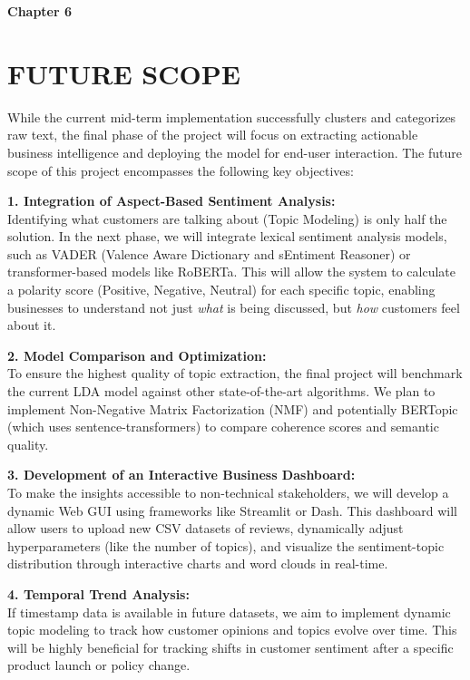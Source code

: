 \newpage
\clearpage
\textbf{\huge Chapter 6} 
\section{FUTURE SCOPE}
\begin{justify}
While the current mid-term implementation successfully clusters and categorizes raw text, the final phase of the project will focus on extracting actionable business intelligence and deploying the model for end-user interaction. The future scope of this project encompasses the following key objectives:

\vspace{0.5cm} %

\textbf{1. Integration of Aspect-Based Sentiment Analysis:}\\
Identifying what customers are talking about (Topic Modeling) is only half the solution. In the next phase, we will integrate lexical sentiment analysis models, such as VADER (Valence Aware Dictionary and sEntiment Reasoner) or transformer-based models like RoBERTa. This will allow the system to calculate a polarity score (Positive, Negative, Neutral) for each specific topic, enabling businesses to understand not just \textit{what} is being discussed, but \textit{how} customers feel about it.

\vspace{0.3cm}

\textbf{2. Model Comparison and Optimization:}\\
To ensure the highest quality of topic extraction, the final project will benchmark the current LDA model against other state-of-the-art algorithms. We plan to implement Non-Negative Matrix Factorization (NMF) and potentially BERTopic (which uses sentence-transformers) to compare coherence scores and semantic quality.

\vspace{0.3cm}

\textbf{3. Development of an Interactive Business Dashboard:}\\
To make the insights accessible to non-technical stakeholders, we will develop a dynamic Web GUI using frameworks like Streamlit or Dash. This dashboard will allow users to upload new CSV datasets of reviews, dynamically adjust hyperparameters (like the number of topics), and visualize the sentiment-topic distribution through interactive charts and word clouds in real-time.

\vspace{0.3cm}

\textbf{4. Temporal Trend Analysis:}\\
If timestamp data is available in future datasets, we aim to implement dynamic topic modeling to track how customer opinions and topics evolve over time. This will be highly beneficial for tracking shifts in customer sentiment after a specific product launch or policy change.
\end{justify}